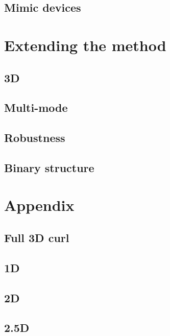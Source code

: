 \subsection{Mimic devices}

\section{Extending the method}
\subsection{3D}
\subsection{Multi-mode}
\subsection{Robustness}
\subsection{Binary structure}


\section{Appendix}
\subsection{Full 3D curl}
\subsection{1D}
\subsection{2D}
\subsection{2.5D}
